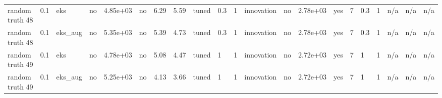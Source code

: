 \begin{table}[t]
\begin{tabular}{lllllllllllllllllllll}
random truth 48 & 0.1 & eks & no & 4.85e+03 & no & 6.29 & 5.59 & tuned & 0.3 & 1 & innovation & no & 2.78e+03 & yes & 7 & 0.3 & 1 & n/a & n/a & n/a \\
random truth 48 & 0.1 & eks\_aug & no & 5.35e+03 & no & 5.39 & 4.73 & tuned & 0.3 & 1 & innovation & no & 2.78e+03 & yes & 7 & 0.3 & 1 & n/a & n/a & n/a \\
random truth 49 & 0.1 & eks & no & 4.78e+03 & no & 5.08 & 4.47 & tuned & 1 & 1 & innovation & no & 2.72e+03 & yes & 7 & 1 & 1 & n/a & n/a & n/a \\
random truth 49 & 0.1 & eks\_aug & no & 5.25e+03 & no & 4.13 & 3.66 & tuned & 1 & 1 & innovation & no & 2.72e+03 & yes & 7 & 1 & 1 & n/a & n/a & n/a \\
\bottomrule
\end{tabular}
\end{table}
